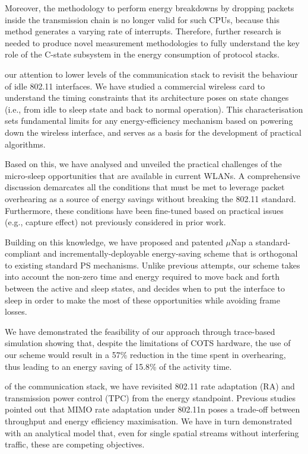 \documentclass[twoside,nohyper]{tufte-book}
\theoremstyle{definition}
\theoremstyle{definition}
\theoremstyle{definition}
\theoremstyle{remark}
\begin{document}
Moreover, the methodology to perform energy breakdowns by dropping
packets inside the transmission chain is no longer valid for such CPUs,
because this method generates a varying rate of interrupts. Therefore,
further research is needed to produce novel measurement methodologies to
fully understand the key role of the C-state subsystem in the energy
consumption of protocol stacks.

 our attention to lower levels of the
communication stack to revisit the behaviour of idle 802.11 interfaces.
We have studied a commercial wireless card to understand the timing
constraints that its architecture poses on state changes (i.e., from
idle to sleep state and back to normal operation). This characterisation
sets fundamental limits for any energy-efficiency mechanism based on
powering down the wireless interface, and serves as a basis for the
development of practical algorithms.

Based on this, we have analysed and unveiled the practical challenges of
the micro-sleep opportunities that are available in current WLANs. A
comprehensive discussion demarcates all the conditions that must be met
to leverage packet overhearing as a source of energy savings without
breaking the 802.11 standard. Furthermore, these conditions have been
fine-tuned based on practical issues (e.g., capture effect) not
previously considered in prior work.

Building on this knowledge, we have
proposed\cite[-1in]{contrib-05a}
and
patented\cite[-.2in]{contrib-05b}
\(\mu\)Nap a standard-compliant and incrementally-deployable
energy-saving scheme that is orthogonal to existing standard PS
mechanisms. Unlike previous attempts, our scheme takes into account the
non-zero time and energy required to move back and forth between the
active and sleep states, and decides when to put the interface to sleep
in order to make the most of these opportunities while avoiding frame
losses.

We have demonstrated the feasibility of our approach through trace-based
simulation showing that, despite the limitations of COTS hardware, the
use of our scheme would result in a 57\% reduction in the time spent in
overhearing, thus leading to an energy saving of 15.8\% of the activity
time.

 of the communication stack, we have
revisited 802.11 rate adaptation (RA) and transmission power control
(TPC) from the energy standpoint. Previous studies pointed out that MIMO
rate adaptation under 802.11n poses a trade-off between throughput and
energy efficiency maximisation. We have in turn demonstrated with an
analytical model that, even for single spatial streams without
interfering traffic, these are competing objectives.
\end{document}
